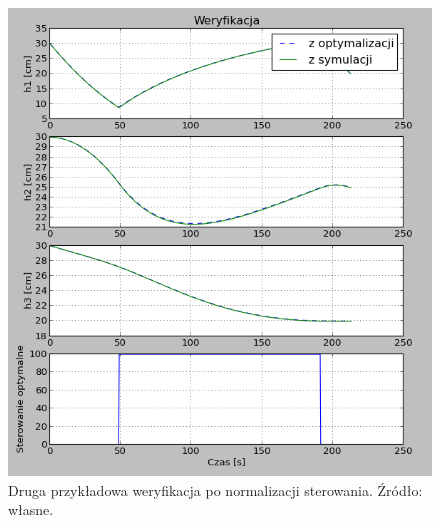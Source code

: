 \begin{figure}[htp]
    \centering
    \includegraphics{Grafika/plot_30_30_30-20_25_20_normalised_200}
    \caption{Druga przykładowa weryfikacja po normalizacji sterowania. Źródło: własne.}
    \label{fig:plot303030-202520normalised200}
\end{figure}

